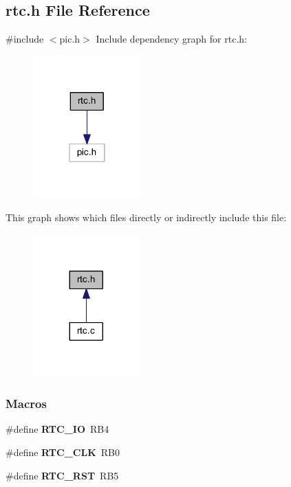 \subsection{rtc.\+h File Reference}
\label{a00044}
{\ttfamily \#include $<$pic.\+h$>$}\newline
Include dependency graph for rtc.\+h\+:
\nopagebreak
\begin{figure}[H]
\begin{center}
\leavevmode
\includegraphics[width=118pt]{a00045}
\end{center}
\end{figure}
This graph shows which files directly or indirectly include this file\+:
\nopagebreak
\begin{figure}[H]
\begin{center}
\leavevmode
\includegraphics[width=116pt]{a00046}
\end{center}
\end{figure}
\subsubsection*{Macros}
\begin{DoxyCompactItemize}
\item 
\#define \textbf{ R\+T\+C\+\_\+\+IO}~R\+B4
\item 
\#define \textbf{ R\+T\+C\+\_\+\+C\+LK}~R\+B0
\item 
\#define \textbf{ R\+T\+C\+\_\+\+R\+ST}~R\+B5
\end{DoxyCompactItemize}
